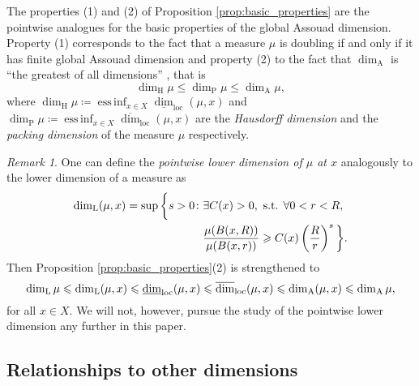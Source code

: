\documentclass{PRM}
\newcommand{\updim}{\overline{\dim}}
\newcommand{\lowdim}{\underline{\dim}}
\newcommand{\adim}{\dim_{\mathrm{A}}}
\DeclareMathOperator*{\essinf}{ess\,inf}
\theoremstyle{plain}
\theoremstyle{definition}
\theoremstyle{remark}
\newtheorem{huom}[thm]{Remark}
\begin{document}
The properties (1) and (2) of Proposition \ref{prop:basic_properties} are the pointwise analogues for the basic properties of the global Assouad dimension. Property (1) corresponds to the fact that a measure $\mu$ is doubling if and only if it has finite global Assouad dimension and property (2) to the fact that $\adim$ is ``the greatest of all dimensions'' \cite{F}, that is
\begin{equation*}
    \dim_{\mathrm{H}}\mu\leq \dim_{\mathrm{P}}\mu\leq\adim\mu,
\end{equation*}
where $\dim_{\mathrm{H}}\mu\coloneqq\essinf_{x\in X}\lowdim_{\mathrm{loc}}(\mu,x)$ and $\dim_{\mathrm{P}}\mu\coloneqq\essinf_{x\in X}\updim_{\mathrm{loc}}(\mu,x)$ are the \emph{Hausdorff dimension} and the \emph{packing dimension} of the measure $\mu$ respectively.

\begin{huom}
One can define the \emph{pointwise lower dimension of $\mu$ at $x$} analogously to the lower dimension of a measure as
\begin{align*}
    \dim_{\mathrm{L}}(\mu,x)=\sup\bigg\{s>0\colon &\exists C(x)>0,\textnormal{ s.t. }\forall0<r<R,\\
    &\frac{\mu(B(x,R))}{\mu(B(x,r))}\geq C(x)\left(\frac{R}{r}\right)^s\bigg\}.
\end{align*}
Then Proposition \ref{prop:basic_properties}(2) is strengthened to 
\begin{equation*}
    \dim_{\mathrm{L}}\mu\leq\dim_{\mathrm{L}}(\mu,x)\leq\lowdim_{\textnormal{loc}}(\mu,x)\leq\updim_{\textnormal{loc}}(\mu,x)\leq \dim_{\mathrm{A}}(\mu,x)\leq\adim\mu,
\end{equation*}
for all $x\in X$. We will not, however, pursue the study of the pointwise lower dimension any further in this paper.
\end{huom}

\subsection{Relationships to other dimensions}
\end{document}
